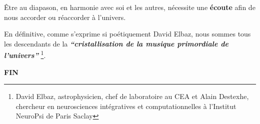 Être au diapason, en harmonie avec soi et les autres,
nécessite une\textbf{ écoute }afin de nous accorder ou réaccorder à
l'univers.

En définitive, comme s'exprime si poétiquement David Elbaz, nous sommes tous les
descendants de la \textit{\textbf{``cristallisation de la musique primordiale de
l'univers''}} \autocite{delbaz_recherche_2016} \footnote{David Elbaz, astrophysicien, chef de laboratoire au CEA et Alain
Destexhe, chercheur en neurosciences intégratives et computationnelles
à l'Institut  NeuroPsi de Paris Saclay}.






                                                                                    \textbf{FIN}













